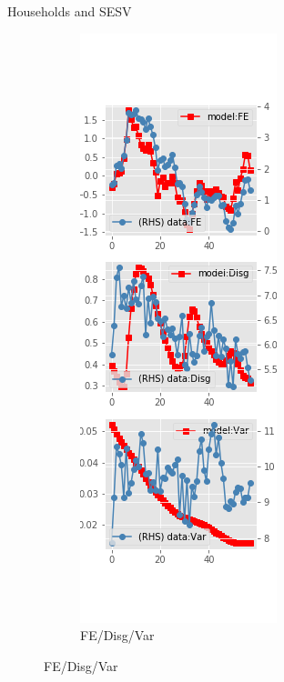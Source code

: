 \documentclass{beamer}
\begin{document}
\begin{frame}{Households and SESV}
\begin{figure}[ht]
\begin{subfigure}[b]{0.2\textwidth}
		\end{subfigure}
	\hfill	\begin{subfigure}[b]{0.2\textwidth}
		\caption{FE/Disg/Var}
		\includegraphics[width=\textwidth, height = 0.8\textheight]{figuresDraft/sce_se_est_sv_diag2.png}
	\end{subfigure}
	\end{figure}
\end{frame}
\end{document}
